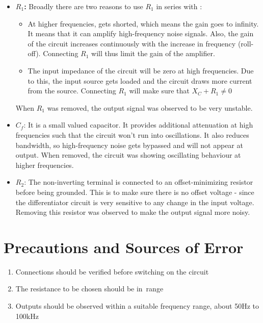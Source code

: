 \begin{itemize}
    \item \textbf{$R_1$:} Broadly there are two reasons to use $R_1$ in series with :
        \begin{itemize}
            \item At higher frequencies,  gets shorted, which means the gain goes to infinity. It means that it can amplify high-frequency noise signals. Also, the gain of the circuit increases continuously with the increase in frequency (roll-off). Connecting $R_1$ will thus limit the gain of the amplifier.
            \item The input impedance of the circuit will be zero at high frequencies. Due to this, the input source gets loaded and the circuit draws more current from the source. Connecting $R_1$ will make sure that $X_C+R_1\ne 0$
        \end{itemize}
    
    When $R_1$ was removed, the output signal was observed to be very unstable.\\
    
    \item $C_f$: It is a small valued capacitor. It provides additional attenuation at high frequencies such that the circuit won't run into oscillations. It also reduces bandwidth, so high-frequency noise gets bypassed and will not appear at output. When removed, the circuit was showing oscillating behaviour at higher frequencies.\\
    \item $R_2$: The non-inverting terminal is connected to an offset-minimizing resistor before being grounded. This is to make sure there is no offset voltage - since the differentiator circuit is very sensitive to any change in the input voltage. Removing this resistor was observed to make the output signal more noisy.
\end{itemize}

\section{Precautions and Sources of Error}

    \begin{enumerate}
        \item Connections should be verified before switching on the circuit
        \item The resistance to be chosen should be in \kohm\,range
        \item Outputs should be observed within a suitable frequency range, about 50Hz to 100kHz
    \end{enumerate}

